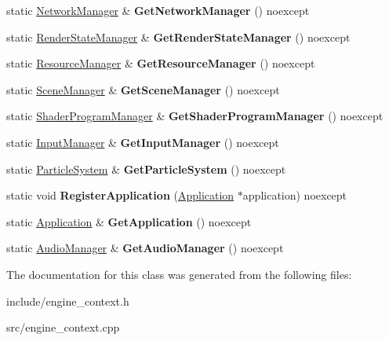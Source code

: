 \begin{DoxyCompactItemize}
static \hyperlink{class_blade_1_1_network_manager}{Network\+Manager} \& {\bfseries Get\+Network\+Manager} () noexcept
\item 
\mbox{\label{class_blade_1_1_engine_context_a31c0db645fa12534692516f7f5ae270f}} 
static \hyperlink{class_blade_1_1_render_state_manager}{Render\+State\+Manager} \& {\bfseries Get\+Render\+State\+Manager} () noexcept
\item 
\mbox{\label{class_blade_1_1_engine_context_a8335eb461fad9d929028158c4f389ffa}} 
static \hyperlink{class_blade_1_1_resource_manager}{Resource\+Manager} \& {\bfseries Get\+Resource\+Manager} () noexcept
\item 
\mbox{\label{class_blade_1_1_engine_context_a377c7a9650027e9bf635bcfa2a2cb5d5}} 
static \hyperlink{class_blade_1_1_scene_manager}{Scene\+Manager} \& {\bfseries Get\+Scene\+Manager} () noexcept
\item 
\mbox{\label{class_blade_1_1_engine_context_a0d3725af9576da43c54ec182b0bb797f}} 
static \hyperlink{class_blade_1_1_shader_program_manager}{Shader\+Program\+Manager} \& {\bfseries Get\+Shader\+Program\+Manager} () noexcept
\item 
\mbox{\label{class_blade_1_1_engine_context_aa4fcca132d847fe4c9ee9a16b7e347d3}} 
static \hyperlink{class_blade_1_1_input_manager}{Input\+Manager} \& {\bfseries Get\+Input\+Manager} () noexcept
\item 
\mbox{\label{class_blade_1_1_engine_context_aca2df73f49a3b33af733e1c04cdef040}} 
static \hyperlink{class_blade_1_1_particle_system}{Particle\+System} \& {\bfseries Get\+Particle\+System} () noexcept
\item 
\mbox{\label{class_blade_1_1_engine_context_a1cb4db31c19ed43f5050cafd57b78bde}} 
static void {\bfseries Register\+Application} (\hyperlink{class_blade_1_1_application}{Application} $\ast$application) noexcept
\item 
\mbox{\label{class_blade_1_1_engine_context_aa3f0da18a061c021d031951b68e461c9}} 
static \hyperlink{class_blade_1_1_application}{Application} \& {\bfseries Get\+Application} () noexcept
\item 
\mbox{\label{class_blade_1_1_engine_context_a0fbfe001768f56cc80437751bd453225}} 
static \hyperlink{class_blade_1_1_audio_manager}{Audio\+Manager} \& {\bfseries Get\+Audio\+Manager} () noexcept
\end{DoxyCompactItemize}


The documentation for this class was generated from the following files\+:\begin{DoxyCompactItemize}
\item 
include/engine\+\_\+context.\+h\item 
src/engine\+\_\+context.\+cpp\end{DoxyCompactItemize}
